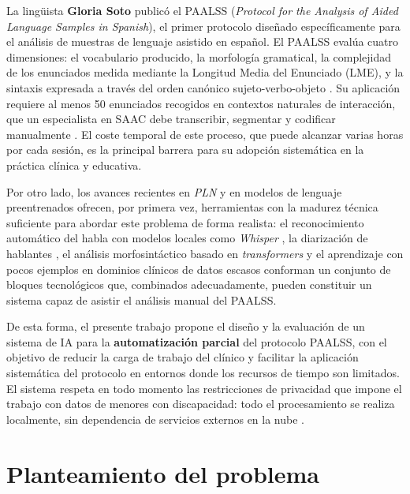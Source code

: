 La lingüista \textbf{Gloria Soto} publicó el \ac{PAALSS} (\emph{Protocol for the
Analysis of Aided Language Samples in Spanish}), el primer protocolo diseñado 
específicamente para el análisis de muestras de lenguaje asistido en español. 
El \ac{PAALSS} evalúa cuatro dimensiones: el vocabulario producido, la morfología 
gramatical, la complejidad de los enunciados medida mediante la Longitud Media del 
Enunciado (\ac{LME}), y la sintaxis expresada a través del orden canónico sujeto-verbo-objeto
\cite{soto2022paalss_tutorial}. Su aplicación requiere al menos 50 enunciados recogidos 
en contextos naturales de interacción, que un especialista en \ac{SAAC} debe transcribir, 
segmentar y codificar manualmente \cite{soto2024paalss_pilot}. El coste temporal de este proceso, que puede
alcanzar varias horas por cada sesión, es la principal barrera para su adopción sistemática 
en la práctica clínica y educativa.

Por otro lado, los avances recientes en \textit{\ac{PLN}} y en modelos de lenguaje
preentrenados ofrecen, por primera vez, herramientas con la madurez técnica
suficiente para abordar este problema de forma realista: el reconocimiento
automático del habla con modelos locales como \emph{Whisper}
\cite{lsa_swiss_benchmark}, la diarización de hablantes
\cite{whisper_diarization_realtime}, el análisis morfosintáctico basado en
\emph{transformers} \cite{lsa_automation_jslhr} y el aprendizaje con pocos ejemplos 
en dominios clínicos de datos escasos \cite{fewshot_clinical_nlp} conforman un 
conjunto de bloques tecnológicos que, combinados adecuadamente, pueden constituir 
un sistema capaz de asistir el análisis manual del \ac{PAALSS}.

De esta forma, el presente trabajo propone el diseño y la evaluación de un
sistema de \ac{IA} para la \textbf{automatización parcial} del protocolo \ac{PAALSS},
con el objetivo de reducir la carga de trabajo del clínico y facilitar la
aplicación sistemática del protocolo en entornos donde los recursos de tiempo
son limitados. El sistema respeta en todo momento las restricciones de
privacidad que impone el trabajo con datos de menores con discapacidad:
todo el procesamiento se realiza localmente, sin dependencia de servicios
externos en la nube \cite{lsa_swiss_benchmark}.


\section{Planteamiento del problema}

